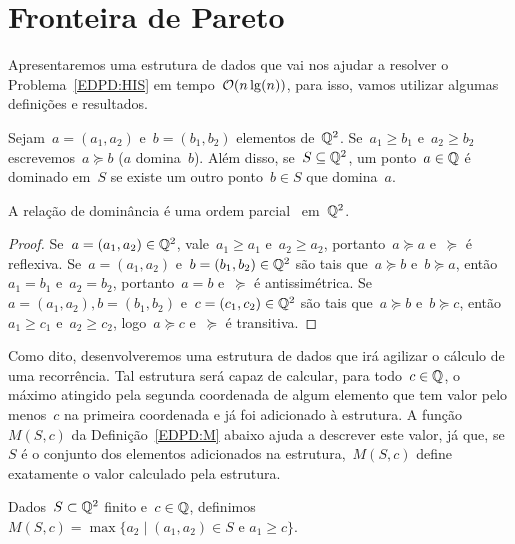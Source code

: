 
\section{Fronteira de Pareto}

Apresentaremos uma estrutura de dados que vai nos ajudar a resolver o Problema~\ref{EDPD:HIS} em tempo~$\mathcal{O}(n\lg(n))$, para isso, vamos utilizar algumas definições e resultados.

\begin{defi}
Sejam~${ a = (a_1,a_2) }$ e~${ b = (b_1,b_2) }$ elementos de~$\mathbb{Q}^2$. Se~${ a_1 \geq b_1 }$ e~${ a_2 \geq b_2 }$ escrevemos~${ a \succeq b }$ ($a$ domina~$b$). Além disso, se~${ S \subseteq \mathbb{Q}^2 }$, um ponto~${ a \in \mathbb{Q} }$ é dominado em~$S$ se existe um outro ponto~$b \in S$ que domina~$a$.
\end{defi}

\begin{prop}
A relação de dominância é uma ordem parcial~\cite[Apêndice B]{CLRS} em~$\mathbb{Q}^2$.
\end{prop}
\begin{proof}
Se~$a = (a_1,a_2) \in \mathbb{Q}^2$, vale~$a_1 \geq a_1$ e~$a_2 \geq a_2$, portanto~$a \succeq a$ e~$\succeq$ é reflexiva. Se~$a = (a_1,a_2)$ e~$b = (b_1,b_2) \in \mathbb{Q}^2$ são tais que~$a \succeq b$ e~$b \succeq a$, então~$a_1 = b_1$ e~$a_2 = b_2$, portanto~$a = b$ e~$\succeq$ é antissimétrica. Se~$a = (a_1,a_2), b = (b_1,b_2)$ e~$c = (c_1,c_2) \in \mathbb{Q}^2$ são tais que~$a \succeq b$ e~$b \succeq c$, então~$a_1 \geq c_1$ e~$a_2 \geq c_2$, logo~$a \succeq c$ e~$\succeq$ é transitiva.
\end{proof}

Como dito, desenvolveremos uma estrutura de dados que irá agilizar o cálculo de uma recorrência. Tal estrutura será capaz de calcular, para todo~${ c \in \mathbb{Q} }$, o máximo atingido pela segunda coordenada de algum elemento que tem valor pelo menos~$c$ na primeira coordenada e já foi adicionado à estrutura. A função~$M(S,c)$ da Definição~\ref{EDPD:M} abaixo ajuda a descrever este valor, já que, se~$S$ é o conjunto dos elementos adicionados na estrutura,~$M(S,c)$ define exatamente o valor calculado pela estrutura.
\begin{defi} \label{EDPD:M}
Dados~$S \subset \mathbb{Q}^2$ finito e~$c \in \mathbb{Q}$, definimos~${M(S,c) = \max\{a_2 \mid (a_1,a_2) \in S \text{ e } a_1 \geq c\}}$.
\end{defi}


